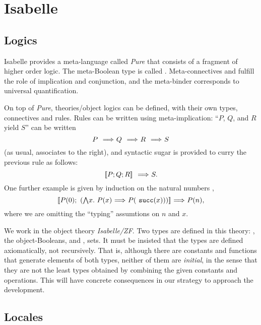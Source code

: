 \section{Isabelle}

\subsection{Logics}

Isabelle provides a meta-language called \emph{Pure} that consists of
a fragment of higher order logic. The meta-Boolean type is called
. Meta-connectives
\isatt{\isasymLongrightarrow} and \isatt{\&\&\&} fulfill the role of
implication and conjunction, and the meta-binder \isatt{\isasymAnd}
corresponds to universal quantification. 

On top of \emph{Pure}, theories/object logics can be defined, with
their own types, connectives and rules. Rules can be written  using
meta-implication: ``$P$, $Q$, and $R$ yield $S$'' can be written
\[
P \ \isatt{\isasymLongrightarrow}\ Q\ \isatt{\isasymLongrightarrow}\ R\ \isatt{\isasymLongrightarrow}\ S
\]
(as usual,  \isatt{\isasymLongrightarrow} associates to the right), and
syntactic sugar is provided to curry the previous rule as follows:
\[
\isasymlbrakk P; Q; R \isasymrbrakk \ \isatt{\isasymLongrightarrow}\ S.
\]
One further example is given by induction on the natural numbers
,
\[
\isasymlbrakk P(0);\ (\textstyle\isasymAnd
x.\ P(x)\ \isasymLongrightarrow\ P(\isatt{succ}(x))) \isasymrbrakk
\ \isasymLongrightarrow\ P(n), 
\]
where we are omitting the ``typing'' assumtions on $n$ and $x$.

We work in the object theory \emph{Isabelle/ZF}. Two types are defined
in this theory: \tyo, the object-Booleans, and \tyi,
sets. It must be insisted that the types are defined axiomatically, not
recursively. That is, although there are constants and functions that
generate elements of both types, neither of them are 
\emph{initial}, in the sense that they are not the least types
obtained by combining the given constants and operations. This will
have concrete consequences in our strategy to approach the development.

\subsection{Locales}

